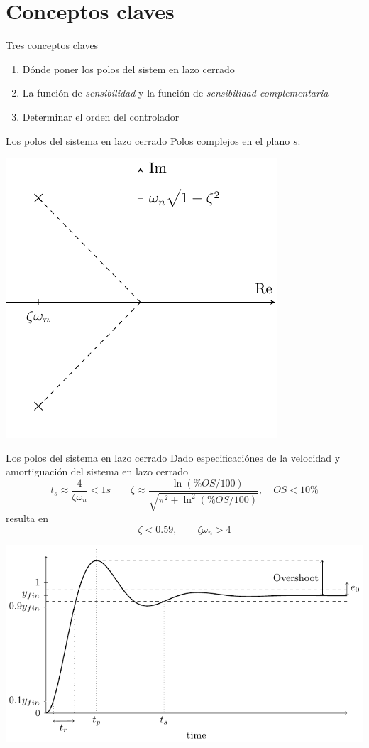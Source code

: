 \documentclass[presentation,aspectratio=169]{beamer}
\begin{document}
\section{Conceptos claves}
\label{sec:org1724e03}
\begin{frame}[label={sec:orge0f1b06}]{Tres conceptos claves}
\begin{enumerate}
\item Dónde poner los polos del sistem en lazo cerrado
\item La función de \emph{sensibilidad} y la función de \emph{sensibilidad complementaria}
\item Determinar el orden del controlador
\end{enumerate}
\end{frame}

\begin{frame}[label={sec:orgd434e5b}]{Los polos del sistema en lazo cerrado}
Polos complejos en el plano \(s\):
\begin{center}
\includegraphics[width=0.45\linewidth]{../../figures/implane-second-order-poles}
\end{center}
\end{frame}

\begin{frame}[label={sec:orgbf53fa8}]{Los polos del sistema en lazo cerrado}
Dado especificaciónes de la velocidad y amortiguación del sistema en lazo cerrado
\[ t_s \approx \frac{4}{\zeta\omega_n} < 1 s \qquad \zeta \approx \frac{-\ln (\%OS/100)}{\sqrt{\pi^2 + \ln^2(\%OS/100)}}, \quad OS < 10\%  \]
resulta en 
\[ \zeta < 0.59,  \qquad \zeta\omega_n > 4\]

\begin{center}
\includegraphics[width=0.6\linewidth]{../../figures/step-response-specifications}
\end{center}
\end{frame}
\end{document}
